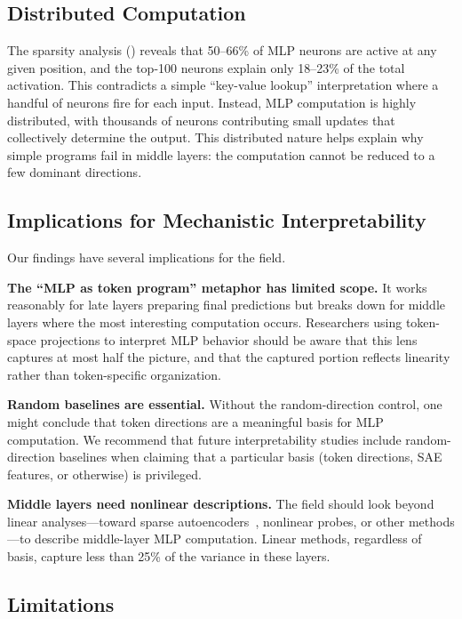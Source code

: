 \subsection{Distributed Computation}

The sparsity analysis () reveals that 50--66\% of MLP neurons are active at any given position, and the top-100 neurons explain only 18--23\% of the total activation.
This contradicts a simple ``key-value lookup'' interpretation where a handful of neurons fire for each input.
Instead, MLP computation is highly distributed, with thousands of neurons contributing small updates that collectively determine the output.
This distributed nature helps explain why simple programs fail in middle layers: the computation cannot be reduced to a few dominant directions.

\subsection{Implications for Mechanistic Interpretability}

Our findings have several implications for the field.

{\bf The ``MLP as token program'' metaphor has limited scope.}
It works reasonably for late layers preparing final predictions but breaks down for middle layers where the most interesting computation occurs.
Researchers using token-space projections to interpret MLP behavior should be aware that this lens captures at most half the picture, and that the captured portion reflects linearity rather than token-specific organization.

{\bf Random baselines are essential.}
Without the random-direction control, one might conclude that token directions are a meaningful basis for MLP computation.
We recommend that future interpretability studies include random-direction baselines when claiming that a particular basis (token directions, SAE features, or otherwise) is privileged.

{\bf Middle layers need nonlinear descriptions.}
The field should look beyond linear analyses---toward sparse autoencoders~\citep{cunningham2023sparse}, nonlinear probes, or other methods---to describe middle-layer MLP computation.
Linear methods, regardless of basis, capture less than 25\% of the variance in these layers.

\subsection{Limitations}
\label{sec:limitations}


